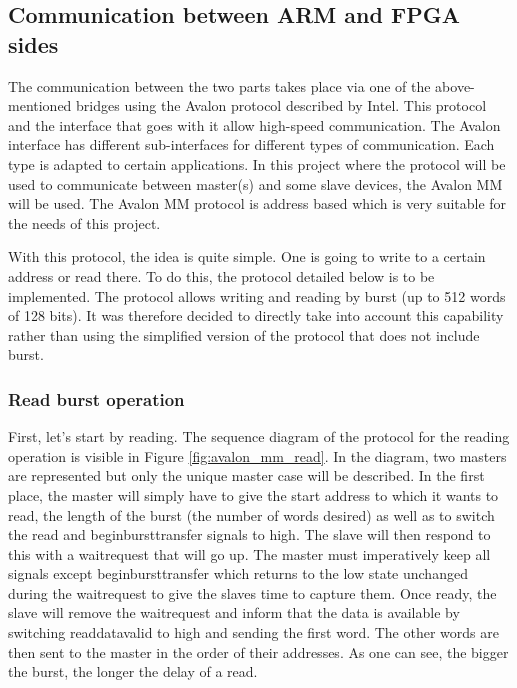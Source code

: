 \documentclass[12pt]{article}
\begin{document}
\subsection{Communication between ARM and FPGA sides}

The communication between the two parts takes place via one of the above-mentioned bridges using the Avalon protocol described by Intel. This protocol and the interface that goes with it allow high-speed communication. The Avalon interface has different sub-interfaces for different types of communication. Each type is adapted to certain applications. In this project where the protocol will be used to communicate between master(s) and some slave devices, the Avalon MM will be used. The Avalon MM protocol is address based which is very suitable for the needs of this project.

\vspace{12pt}
With this protocol, the idea is quite simple. One is going to write to a certain address or read there. To do this, the protocol detailed below is to be implemented. The protocol allows writing and reading by burst (up to 512 words of 128 bits). It was therefore decided to directly take into account this capability rather than using the simplified version of the protocol that does not include burst.

\subsubsection{Read burst operation}

First, let's start by reading. The sequence diagram of the protocol for the reading operation is visible in Figure \ref{fig:avalon_mm_read}. In the diagram, two masters are represented but only the unique master case will be described. In the first place, the master will simply have to give the start address to which it wants to read, the length of the burst (the number of words desired) as well as to switch the read and beginbursttransfer signals to high. The slave will then respond to this with a waitrequest that will go up. The master must imperatively keep all signals except beginbursttransfer which returns to the low state unchanged during the waitrequest to give the slaves time to capture them. Once ready, the slave will remove the waitrequest and inform that the data is available by switching readdatavalid to high and sending the first word. The other words are then sent to the master in the order of their addresses. As one can see, the bigger the burst, the longer the delay of a read.
\end{document}
